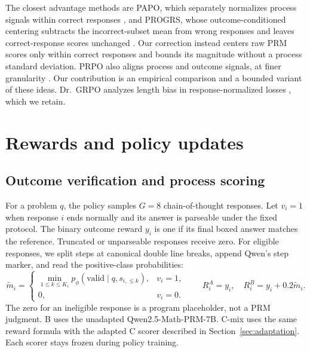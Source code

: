 \documentclass{article}
\begin{document}
The closest advantage methods are PAPO, which separately normalizes process signals within correct responses \citep{tan2026}, and PROGRS, whose outcome-conditioned centering subtracts the incorrect-subset mean from wrong responses and leaves correct-response scores unchanged \citep[their Eq.~(2)]{rezaei2026}. Our correction instead centers raw PRM scores only within correct responses and bounds its magnitude without a process standard deviation. PRPO also aligns process and outcome signals, at finer granularity \citep{ding2026}. Our contribution is an empirical comparison and a bounded variant of these ideas. Dr.~GRPO analyzes length bias in response-normalized losses \citep{liu2025}, which we retain.

\clearpage
\section{Rewards and policy updates}
\subsection{Outcome verification and process scoring}
For a problem $q$, the policy samples $G=8$ chain-of-thought responses. Let $v_i=1$ when response $i$ ends normally and its answer is parseable under the fixed protocol. The binary outcome reward $y_i$ is one if its final boxed answer matches the reference. Truncated or unparseable responses receive zero. For eligible responses, we split steps at canonical double line breaks, append Qwen's step marker, and read the positive-class probabilities:
\begin{equation}
 \widetilde m_i=\begin{cases}
 \min_{1\leq k\leq K_i}p_\phi(\mathrm{valid}\mid q,s_{i,\leq k}),&v_i=1,\\
 0,&v_i=0.
 \end{cases}
 \qquad R_i^A=y_i,\quad R_i^B=y_i+0.2\widetilde m_i.
 \label{eq:rewards}
\end{equation}
The zero for an ineligible response is a program placeholder, not a PRM judgment. B uses the unadapted Qwen2.5-Math-PRM-7B. C-mix uses the same reward formula with the adapted C scorer described in Section~\ref{sec:adaptation}. Each scorer stays frozen during policy training.
\end{document}
